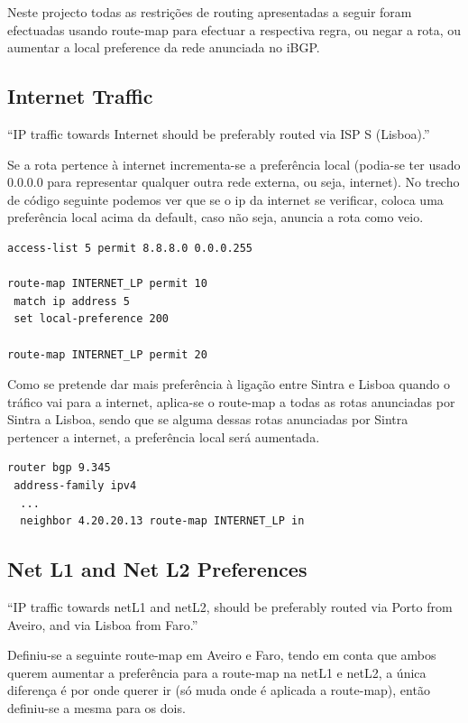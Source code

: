 \documentclass[11pt,a4paper]{report}
\begin{document}
Neste projecto todas as restrições de routing apresentadas a seguir foram efectuadas usando route-map para efectuar a respectiva regra, ou negar a rota, ou aumentar a local preference da rede anunciada no iBGP.

\subsection{Internet Traffic}

``IP traffic towards Internet should be preferably routed via ISP S (Lisboa).''
\newline

Se a rota pertence à internet incrementa-se a preferência local (podia-se ter usado 0.0.0.0 para representar qualquer outra rede externa, ou seja, internet). No trecho de código seguinte podemos ver que se o ip da internet se verificar, coloca uma preferência local acima da default, caso não seja, anuncia a rota como veio.

\begin{lstlisting}[caption=Route-map para a Internet]
access-list 5 permit 8.8.8.0 0.0.0.255

route-map INTERNET_LP permit 10
 match ip address 5
 set local-preference 200

route-map INTERNET_LP permit 20
\end{lstlisting}

Como se pretende dar mais preferência à ligação entre Sintra e Lisboa quando o tráfico vai para a internet, aplica-se o route-map a todas as rotas anunciadas por Sintra a Lisboa, sendo que se alguma dessas rotas anunciadas por Sintra pertencer a internet, a preferência local será aumentada.\\

\begin{lstlisting}[caption=Route-map da Internet no Neighbor Sintra no Router de Lisboa]
router bgp 9.345
 address-family ipv4
  ...
  neighbor 4.20.20.13 route-map INTERNET_LP in
\end{lstlisting}

\subsection{Net L1 and Net L2 Preferences}

``IP traffic towards netL1 and netL2, should be preferably routed via Porto from Aveiro, and via Lisboa from Faro.''
\newline

Definiu-se a seguinte route-map em Aveiro e Faro, tendo em conta que ambos querem aumentar a preferência para a route-map na netL1 e netL2, a única diferença é por onde querer ir (só muda onde é aplicada a route-map), então definiu-se a mesma para os dois.
\end{document}
